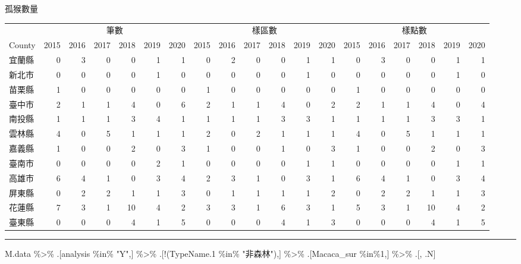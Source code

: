 \documentclass[
]{article}
\newenvironment{Shaded}{\begin{snugshade}}{\end{snugshade}}
\newcommand{\DecValTok}[1]{\textcolor[rgb]{0.00,0.00,0.81}{#1}}
\newcommand{\FloatTok}[1]{\textcolor[rgb]{0.00,0.00,0.81}{#1}}
\newcommand{\NormalTok}[1]{#1}
\newcommand{\SpecialCharTok}[1]{\textcolor[rgb]{0.00,0.00,0.00}{#1}}
\newcommand{\StringTok}[1]{\textcolor[rgb]{0.31,0.60,0.02}{#1}}
\begin{document}
孤猴數量

\begin{table}[H]
\centering
\begin{tabular}{l|r|r|r|r|r|r|r|r|r|r|r|r|r|r|r|r|r|r}
\hline
\multicolumn{1}{c|}{ } & \multicolumn{6}{c|}{筆數} & \multicolumn{6}{c|}{樣區數} & \multicolumn{6}{c}{樣點數} \\
\cline{2-7} \cline{8-13} \cline{14-19}
County &  2015 &  2016 &  2017 &  2018 &  2019 &  2020 &  2015 &  2016 &  2017 &  2018 &  2019 &  2020 &  2015 &  2016 &  2017 &  2018 &  2019 &  2020\\
\hline
宜蘭縣 & 0 & 3 & 0 & 0 & 1 & 1 & 0 & 2 & 0 & 0 & 1 & 1 & 0 & 3 & 0 & 0 & 1 & 1\\
\hline
新北市 & 0 & 0 & 0 & 0 & 1 & 0 & 0 & 0 & 0 & 0 & 1 & 0 & 0 & 0 & 0 & 0 & 1 & 0\\
\hline
苗栗縣 & 1 & 0 & 0 & 0 & 0 & 0 & 1 & 0 & 0 & 0 & 0 & 0 & 1 & 0 & 0 & 0 & 0 & 0\\
\hline
臺中市 & 2 & 1 & 1 & 4 & 0 & 6 & 2 & 1 & 1 & 4 & 0 & 2 & 2 & 1 & 1 & 4 & 0 & 4\\
\hline
南投縣 & 1 & 1 & 1 & 3 & 4 & 1 & 1 & 1 & 1 & 3 & 3 & 1 & 1 & 1 & 1 & 3 & 3 & 1\\
\hline
雲林縣 & 4 & 0 & 5 & 1 & 1 & 1 & 2 & 0 & 2 & 1 & 1 & 1 & 4 & 0 & 5 & 1 & 1 & 1\\
\hline
嘉義縣 & 1 & 0 & 0 & 2 & 0 & 3 & 1 & 0 & 0 & 1 & 0 & 3 & 1 & 0 & 0 & 2 & 0 & 3\\
\hline
臺南市 & 0 & 0 & 0 & 0 & 2 & 1 & 0 & 0 & 0 & 0 & 1 & 1 & 0 & 0 & 0 & 0 & 1 & 1\\
\hline
高雄市 & 6 & 4 & 1 & 0 & 3 & 4 & 2 & 3 & 1 & 0 & 3 & 1 & 6 & 4 & 1 & 0 & 3 & 4\\
\hline
屏東縣 & 0 & 2 & 2 & 1 & 1 & 3 & 0 & 1 & 1 & 1 & 1 & 2 & 0 & 2 & 2 & 1 & 1 & 3\\
\hline
花蓮縣 & 7 & 3 & 1 & 10 & 4 & 2 & 3 & 3 & 1 & 6 & 3 & 1 & 5 & 3 & 1 & 10 & 4 & 2\\
\hline
臺東縣 & 0 & 0 & 0 & 4 & 1 & 5 & 0 & 0 & 0 & 4 & 1 & 3 & 0 & 0 & 0 & 4 & 1 & 5\\
\hline
\end{tabular}
\end{table}

\begin{center}\rule{0.5\linewidth}{0.5pt}\end{center}

\begin{Shaded}
\begin{Highlighting}[]
\NormalTok{M.data }\SpecialCharTok{\%\textgreater{}\%} 
\NormalTok{  .[analysis }\SpecialCharTok{\%in\%} \StringTok{"Y"}\NormalTok{,] }\SpecialCharTok{\%\textgreater{}\%} 
\NormalTok{  .[}\SpecialCharTok{!}\NormalTok{(TypeName}\FloatTok{.1} \SpecialCharTok{\%in\%} \StringTok{"非森林"}\NormalTok{),] }\SpecialCharTok{\%\textgreater{}\%}
\NormalTok{  .[Macaca\_sur }\SpecialCharTok{\%in\%}\DecValTok{1}\NormalTok{,] }\SpecialCharTok{\%\textgreater{}\%}
\NormalTok{  .[, .N] }
\end{Highlighting}
\end{Shaded}
\end{document}
